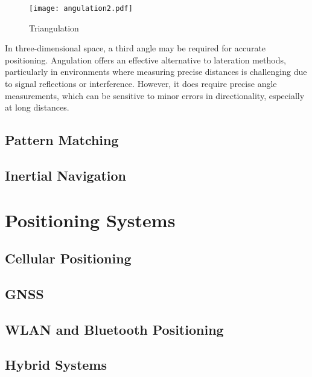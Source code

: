 \begin{figure}[htbp]
    \centering
    \texttt{[image: angulation2.pdf]}
    \caption{Triangulation \cite{militaru2024positioning}}
    \label{fig:angulation2}
\end{figure}

In three-dimensional space, a third angle may be required for accurate positioning. Angulation offers an effective alternative to lateration methods, particularly in environments where measuring precise distances is challenging due to signal reflections or interference. However, it does require precise angle measurements, which can be sensitive to minor errors in directionality, especially at long distances.

\subsection{Pattern Matching}
\subsection{Inertial Navigation}

\section{Positioning Systems}
\subsection{Cellular Positioning}
\subsection{GNSS}

\subsection{WLAN and Bluetooth Positioning}
\subsection{Hybrid Systems}
